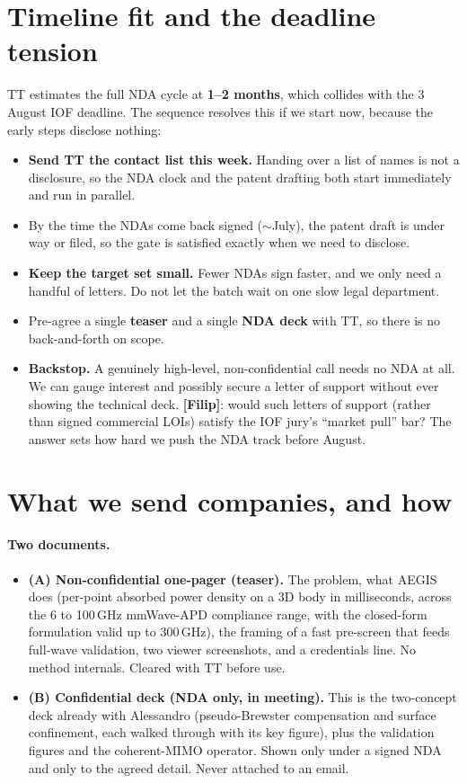 \documentclass[11pt,a4paper]{article}
\newcommand{\owner}[1]{\textbf{[#1]}}
\begin{document}
\section{Timeline fit and the deadline tension}
TT estimates the full NDA cycle at \textbf{1--2 months}, which collides with the 3 August IOF deadline. The
sequence resolves this if we start now, because the early steps disclose nothing:
\begin{itemize}
  \item \textbf{Send TT the contact list this week.} Handing over a list of names is not a disclosure, so the NDA clock and the patent drafting both start immediately and run in parallel.
  \item By the time the NDAs come back signed ($\sim$July), the patent draft is under way or filed, so the gate is satisfied exactly when we need to disclose.
  \item \textbf{Keep the target set small.} Fewer NDAs sign faster, and we only need a handful of letters. Do not let the batch wait on one slow legal department.
  \item Pre-agree a single \textbf{teaser} and a single \textbf{NDA deck} with TT, so there is no back-and-forth on scope.
  \item \textbf{Backstop.} A genuinely high-level, non-confidential call needs no NDA at all. We can gauge interest and possibly secure a letter of support without ever showing the technical deck. \owner{Filip}: would such letters of support (rather than signed commercial LOIs) satisfy the IOF jury's ``market pull'' bar? The answer sets how hard we push the NDA track before August.
\end{itemize}

\section{What we send companies, and how}
\paragraph{Two documents.}
\begin{itemize}
  \item \textbf{(A) Non-confidential one-pager (teaser).} The problem, what AEGIS does (per-point absorbed power density on a 3D body in milliseconds, across the 6 to 100\,GHz mmWave-APD compliance range, with the closed-form formulation valid up to 300\,GHz), the framing of a fast pre-screen that feeds full-wave validation, two viewer screenshots, and a credentials line. No method internals. Cleared with TT before use.
  \item \textbf{(B) Confidential deck (NDA only, in meeting).} This is the two-concept deck already with Alessandro (pseudo-Brewster compensation and surface confinement, each walked through with its key figure), plus the validation figures and the coherent-MIMO operator. Shown only under a signed NDA and only to the agreed detail. Never attached to an email.
\end{itemize}
\end{document}
